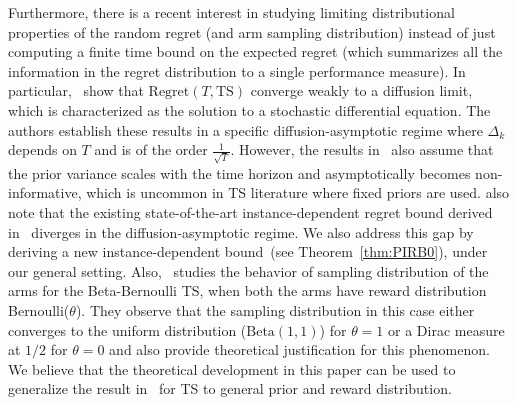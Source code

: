 \documentclass[11pt]{article}
\begin{document}
Furthermore, there is a recent interest in studying limiting distributional properties of the random regret (and arm sampling distribution) instead of just computing a finite time bound on the expected regret (which summarizes all the information in the regret distribution to a single performance measure). In particular,~\cite{Glynn21,Wager21} show that $\text{Regret}(T,\text{TS})$ converge weakly to a diffusion limit, which is characterized as the solution to a stochastic differential equation. The authors establish these results in a specific diffusion-asymptotic regime where $\Delta_k$ depends on $T$ and is of the order  $\frac{1}{\sqrt{T}}$. However, the results in~\cite{Wager21} also assume that the prior variance scales with the time horizon and asymptotically becomes non-informative, which is uncommon in TS literature where fixed priors are used. \cite{Wager21} also note that the existing state-of-the-art instance-dependent regret bound derived in~\cite{agrawal2013further} diverges in the  diffusion-asymptotic regime. We also address this gap by deriving a new instance-dependent bound~(see Theorem~\ref{thm:PIRB0}), under our general setting.
Also,~\cite{Kalvit21} studies the behavior of sampling distribution of the arms for the Beta-Bernoulli TS, when both the arms have reward distribution Bernoulli($\theta$). They observe that the sampling distribution in this case either converges to the uniform distribution ($\text{Beta}(1,1)$) for $\theta=1$ or a Dirac measure at $1/2$ for $\theta=0$ and also provide theoretical justification for this phenomenon. We believe that the theoretical development in this paper can be used to generalize the result in~\cite{Kalvit21} for TS to general prior and reward distribution. %
\end{document}
